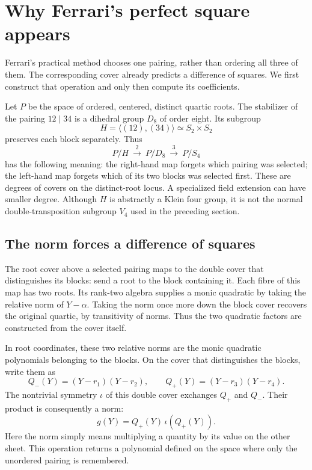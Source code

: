 \documentclass[11pt]{article}
\theoremstyle{remark}
\begin{document}
\section{Why Ferrari's perfect square appears}

Ferrari's practical method chooses one pairing, rather than ordering all three of them. The corresponding cover already predicts a difference of squares. We first construct that operation and only then compute its coefficients.

Let \(P\) be the space of ordered, centered, distinct quartic roots. The stabilizer of the pairing \(12\mid34\) is a dihedral group \(D_8\) of order eight. Its subgroup
\[
H=\langle(12),(34)\rangle\simeq S_2\times S_2
\]
preserves each block separately. Thus
\[
P/H\ \xrightarrow{\ 2\ }\ P/D_8\ \xrightarrow{\ 3\ }\ P/S_4
\]
has the following meaning: the right-hand map forgets which pairing was selected; the left-hand map forgets which of its two blocks was selected first. These are degrees of covers on the distinct-root locus. A specialized field extension can have smaller degree. Although \(H\) is abstractly a Klein four group, it is not the normal double-transposition subgroup \(V_4\) used in the preceding section.

\subsection{The norm forces a difference of squares}

The root cover above a selected pairing maps to the double cover that distinguishes its blocks: send a root to the block containing it. Each fibre of this map has two roots. Its rank-two algebra supplies a monic quadratic by taking the relative norm of \(Y-\alpha\). Taking the norm once more down the block cover recovers the original quartic, by transitivity of norms. Thus the two quadratic factors are constructed from the cover itself.

In root coordinates, these two relative norms are the monic quadratic polynomials belonging to the blocks. On the cover that distinguishes the blocks, write them as
\[
Q_-(Y)=(Y-r_1)(Y-r_2),\qquad
Q_+(Y)=(Y-r_3)(Y-r_4).
\]
The nontrivial symmetry \(\iota\) of this double cover exchanges \(Q_+\) and \(Q_-\). Their product is consequently a norm:
\[
g(Y)=Q_+(Y)\,\iota(Q_+(Y)).
\]
Here the norm simply means multiplying a quantity by its value on the other sheet. This operation returns a polynomial defined on the space where only the unordered pairing is remembered.
\end{document}
